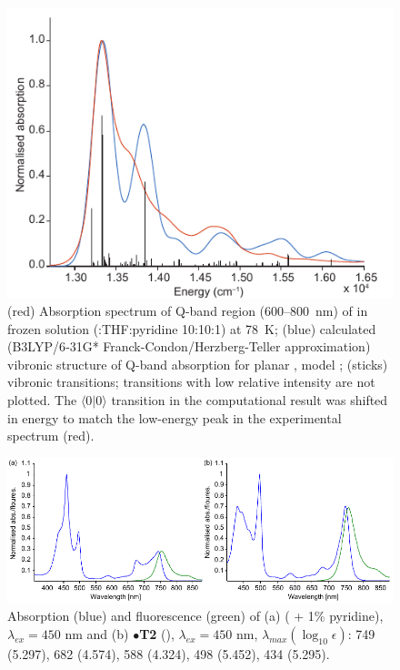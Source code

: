 		\begin{figure}[ht!]
			\centering\includegraphics{figures/dimer/Figure-6.pdf} 
			\caption[]{(red) Absorption spectrum of Q-band region (600–\SI{800}{\nano\metre}) of  in frozen solution (:THF:pyridine 10:10:1) at \SI{78}{\kelvin}; (blue) calculated (B3LYP/6‑31G* Franck-Condon/Herzberg-Teller approximation) vibronic structure of Q-band absorption for planar , model ; (sticks) vibronic transitions; transitions with low relative intensity are not plotted. The $\langle0|0\rangle$ transition in the computational result was shifted in energy to match the low-energy peak in the experimental spectrum (red).}
			\label{fig:dimer:f6}
		\end{figure}

		\begin{figure}[ht!]
			\centering\includegraphics{figures/dimer/si-p2fl-comb.pdf} 
			\caption[]{Absorption (blue) and fluorescence (green) of (a)  ( + 1\% pyridine), $\lambda_{ex} = 450$ nm and (b) $\bullet$\textbf{T2} (), $\lambda_{ex} = 450$ nm, $\lambda_{max}(\log_{10} \epsilon)$: 749 (5.297), 682 (4.574), 588 (4.324), 498 (5.452), 434 (5.295).}
			\label{fig:dimer:s7comb}
		\end{figure}

